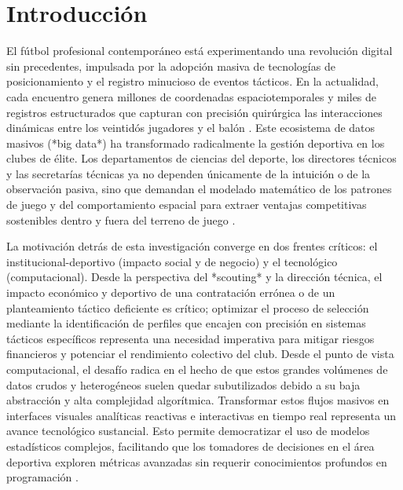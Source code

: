 \documentclass[conference]{IEEEtran}
\begin{document}
\section{Introducción}

El fútbol profesional contemporáneo está experimentando una revolución digital sin precedentes, impulsada por la adopción masiva de tecnologías de posicionamiento y el registro minucioso de eventos tácticos. En la actualidad, cada encuentro genera millones de coordenadas espaciotemporales y miles de registros estructurados que capturan con precisión quirúrgica las interacciones dinámicas entre los veintidós jugadores y el balón \citep{janetzko2014feature, anzer2021goal}. Este ecosistema de datos masivos (*big data*) ha transformado radicalmente la gestión deportiva en los clubes de élite. Los departamentos de ciencias del deporte, los directores técnicos y las secretarías técnicas ya no dependen únicamente de la intuición o de la observación pasiva, sino que demandan el modelado matemático de los patrones de juego y del comportamiento espacial para extraer ventajas competitivas sostenibles dentro y fuera del terreno de juego \citep{zhao2017visual, stein2019where}.

La motivación detrás de esta investigación converge en dos frentes críticos: el institucional-deportivo (impacto social y de negocio) y el tecnológico (computacional). Desde la perspectiva del *scouting* y la dirección técnica, el impacto económico y deportivo de una contratación errónea o de un planteamiento táctico deficiente es crítico; optimizar el proceso de selección mediante la identificación de perfiles que encajen con precisión en sistemas tácticos específicos representa una necesidad imperativa para mitigar riesgos financieros y potenciar el rendimiento colectivo del club. Desde el punto de vista computacional, el desafío radica en el hecho de que estos grandes volúmenes de datos crudos y heterogéneos suelen quedar subutilizados debido a su baja abstracción y alta complejidad algorítmica. Transformar estos flujos masivos en interfaces visuales analíticas reactivas e interactivas en tiempo real representa un avance tecnológico sustancial. Esto permite democratizar el uso de modelos estadísticos complejos, facilitando que los tomadores de decisiones en el área deportiva exploren métricas avanzadas sin requerir conocimientos profundos en programación \citep{perin2013soccerstories, evers2024visual}.
\end{document}
